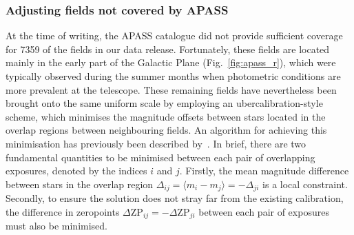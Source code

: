 \documentclass[useAMS,usenatbib]{mn2e}
\begin{document}
\subsubsection{Adjusting fields not covered by APASS}

At the time of writing, the APASS catalogue did not provide 
sufficient coverage for 7359 of the fields in our data release.
Fortunately, these fields are located mainly 
in the early part of the Galactic Plane (Fig.~\ref{fig:apass_r}),
which were typically observed during the summer months
when photometric conditions are more prevalent at the telescope.
These remaining fields have nevertheless 
been brought onto the same uniform scale 
by employing an ubercalibration-style scheme,
which minimises the magnitude offsets between stars
located in the overlap regions between neighbouring fields.
An algorithm for achieving this minimisation
has previously been described by~\citet{Glazebrook1994}.
In brief, there are two fundamental quantities to be
minimised between each pair of overlapping exposures, 
denoted by the indices $i$ and $j$. 
Firstly, the mean magnitude difference between stars in the overlap
region $\Delta_{ij}=\langle m_i-m_j\rangle=-\Delta_{ji}$ is a local
constraint. 
Secondly, to ensure the solution does not stray far 
from the existing calibration, 
the difference in zeropoints 
$\Delta\mathrm{ZP}_{ij}=-\Delta\mathrm{ZP}_{ji}$ 
between each pair of exposures must also be minimised.
\end{document}
